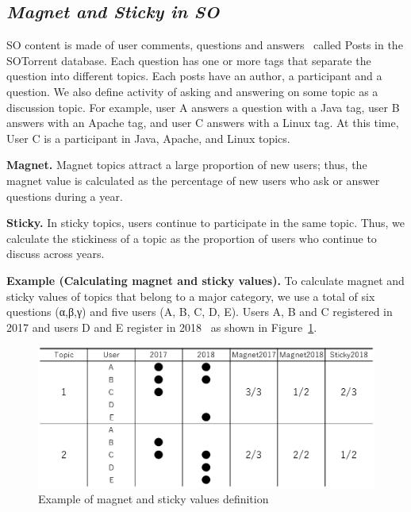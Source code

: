 \documentclass[conference]{IEEEtran}
\begin{document}
\subsection*{\textit{\textbf{Magnet and Sticky in SO}}}

SO content is made of user comments, questions and answers~\cite{liu2018mining} called Posts in the  SOTorrent\cite{baltes2018sotorrent} database. Each question has one or more tags that separate the question into different topics. Each posts have an author, a participant and a question. We also define activity of asking and answering on some topic as a discussion topic. For example, user A answers a question with a Java tag, user B answers with an Apache tag, and user C answers with a Linux tag. At this time, User C is a participant in Java, Apache, and Linux topics.

\noindent
\textbf{Magnet.} Magnet topics attract a large proportion of new users; thus, the magnet value is calculated as the percentage of new users who ask or answer questions during a year.

\noindent
\textbf{Sticky.} In sticky topics, users continue to participate in the same topic. Thus, we calculate the stickiness of a topic as the proportion of users who continue to discuss across years.

\noindent
\textbf{Example (Calculating magnet and sticky values).}
To calculate magnet and sticky values of topics that belong to a major category, we use a total of six questions (α,β,γ) and five users (A, B, C, D, E). Users A, B and C registered in 2017 and users D and E register in 2018~\cite{yamashita2016magnet} as shown in Figure~\ref{fig:example1}.

\begin{figure}[t]
 \centering
 \includegraphics[width=1.0\hsize]{img/fig11.eps}  
 \caption{Example of magnet and sticky values definition} 
 \label{fig:example1} 
\end{figure}
\end{document}

